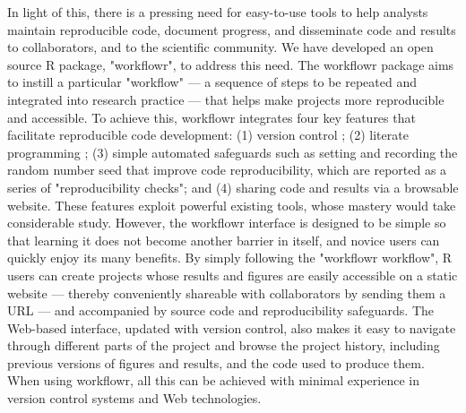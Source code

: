 \documentclass[9pt,a4paper]{extarticle}
\begin{document}
In light of this, there is a pressing need for easy-to-use tools to help
analysts maintain reproducible code, document progress, and disseminate
code and results to collaborators, and to the scientific community. We
have developed an open source R \cite{R2019} package, "workflowr", to
address this need. The workflowr package aims to instill a particular
"workflow" --- a sequence of steps to be repeated and integrated into
research practice --- that helps make projects more reproducible and
accessible. To achieve this, workflowr integrates four key features that
facilitate reproducible code development: (1) version control
\cite{Loeliger2012, Chacon2014}; (2) literate programming
\cite{Xie2018}; (3) simple automated safeguards such as setting and
recording the random number seed that improve code reproducibility,
which are reported as a series of "reproducibility checks"; and (4)
sharing code and results via a browsable website. These features exploit
powerful existing tools, whose mastery would take considerable study.
However, the workflowr interface is designed to be simple so that
learning it does not become another barrier in itself, and novice users
can quickly enjoy its many benefits. By simply following the "workflowr
workflow", R users can create projects whose results and figures are
easily accessible on a static website --- thereby conveniently shareable
with collaborators by sending them a URL --- and accompanied by source
code and reproducibility safeguards. The Web-based interface, updated
with version control, also makes it easy to navigate through different
parts of the project and browse the project history, including previous
versions of figures and results, and the code used to produce them. When
using workflowr, all this can be achieved with minimal experience in
version control systems and Web technologies.
\end{document}
